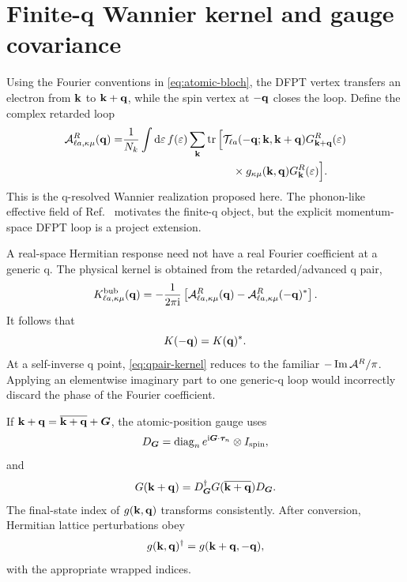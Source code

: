 \section{Finite-q Wannier kernel and gauge covariance}
\label{sec:finite-q}

Using the Fourier conventions in \cref{eq:atomic-bloch}, the DFPT vertex transfers an electron from $\mathbf k$ to $\mathbf k+\mathbf q$, while the spin vertex at $-\mathbf q$ closes the loop. Define the complex retarded loop
\begin{equation}
\begin{split}
\bA^R_{\ell a,\kappa\mu}(\qq)
=&\frac{1}{N_k}\int\dd\varepsilon\,f(\varepsilon)
\sum_{\kk}\tr\Big[
\bT_{\ell a}(-\qq;\kk,\kk+\qq)
G^R_{\kk+\qq}(\varepsilon)\\
&\hspace{35mm}\times
g_{\kappa\mu}(\kk,\qq)
G^R_{\kk}(\varepsilon)\Big].
\end{split}
\label{eq:retarded-loop}
\end{equation}
This is the q-resolved Wannier realization proposed here. The phonon-like effective field of Ref.~\cite{Mankovsky2023SLC} motivates the finite-q object, but the explicit momentum-space DFPT loop is a project extension.

A real-space Hermitian response need not have a real Fourier coefficient at a generic q. The physical kernel is obtained from the retarded/advanced q pair,
\begin{equation}
K^{\rm bub}_{\ell a,\kappa\mu}(\mathbf q)
=-\frac{1}{2\pi\mathrm{i}}
\left[
\mathcal A^R_{\ell a,\kappa\mu}(\mathbf q)
-\mathcal A^R_{\ell a,\kappa\mu}(-\mathbf q)^*
\right].
\label{eq:qpair-kernel}
\end{equation}
It follows that
\begin{equation}
K(-\mathbf q)=K(\mathbf q)^*.
\label{eq:q-reality}
\end{equation}
At a self-inverse q point, \cref{eq:qpair-kernel} reduces to the familiar $-\operatorname{Im}\mathcal A^R/\pi$. Applying an elementwise imaginary part to one generic-q loop would incorrectly discard the phase of the Fourier coefficient.

If $\mathbf k+\mathbf q=\overline{\mathbf k+\mathbf q}+\bm G$, the atomic-position gauge uses
\begin{equation}
D_{\bm G}=\operatorname{diag}_n
 e^{\mathrm{i}\bm G\cdot\bm\tau_n}\otimes I_{\rm spin},
\end{equation}
and
\begin{equation}
G(\mathbf k+\mathbf q)=D_{\bm G}^\dagger
G(\overline{\mathbf k+\mathbf q})D_{\bm G}.
\label{eq:wrap-green}
\end{equation}
The final-state index of $g(\mathbf k,\mathbf q)$ transforms consistently. After conversion, Hermitian lattice perturbations obey
\begin{equation}
g(\mathbf k,\mathbf q)^\dagger=g(\mathbf k+\mathbf q,-\mathbf q),
\label{eq:g-hermiticity}
\end{equation}
with the appropriate wrapped indices.
